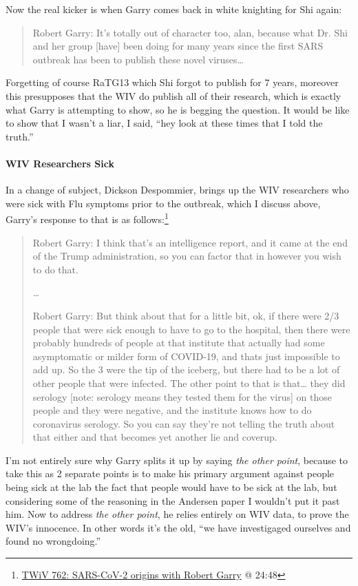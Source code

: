 \documentclass[11pt]{article}
\begin{document}
Now the real kicker is when Garry comes back in white knighting for Shi again:
\begin{quote}
Robert Garry: It's totally out of character too, alan, because what Dr. Shi and her group [have] been doing for many years since the first SARS outbreak has been to publish these novel viruses\ldots{}
\end{quote}
Forgetting of course RaTG13 which Shi forgot to publish for 7 years, moreover this presupposes that the WIV do publish all of their research, which is exactly what Garry is attempting to show, so he is begging the question. It would be like to show that I wasn't a liar, I said, ``hey look at these times that I told the truth.''

\paragraph{WIV Researchers Sick}
\label{sec:org1f50824}
In a change of subject, Dickson Despommier, brings up the WIV researchers who were sick with Flu symptoms prior to the outbreak, which I discuss above, Garry's response to that is as follows:\footnote{\href{https://youtu.be/IxwrDSYrhjU?t=1488}{TWiV 762: SARS-CoV-2 origins with Robert Garry} @ 24:48}
\begin{quote}
Robert Garry: I think that's an intelligence report, and it came at the end of the Trump administration, so you can factor that in however you wish to do that.

\ldots{}

Robert Garry: But think about that for a little bit, ok, if there were 2/3 people that were sick enough to have to go to the hospital, then there were probably hundreds of people at that institute that actually had some asymptomatic or milder form of COVID-19, and thats just impossible to add up. So the 3 were the tip of the iceberg, but there had to be a lot of other people that were infected. The other point to that is that\ldots{} they did serology [note: serology means they tested them for the virus] on those people and they were negative, and the institute knows how to do coronavirus serology. So you can say they're not telling the truth about that either and that becomes yet another lie and coverup.
\end{quote}
I'm not entirely sure why Garry splits it up by saying \emph{the other point}, because to take this as 2 separate points is to make his primary argument against people being sick at the lab the fact that people would have to be sick at the lab, but considering some of the reasoning in the Andersen paper I wouldn't put it past him. Now to address \emph{the other point}, he relies entirely on WIV data, to prove the WIV's innocence. In other words it's the old, ``we have investigaged ourselves and found no wrongdoing.''
\end{document}
